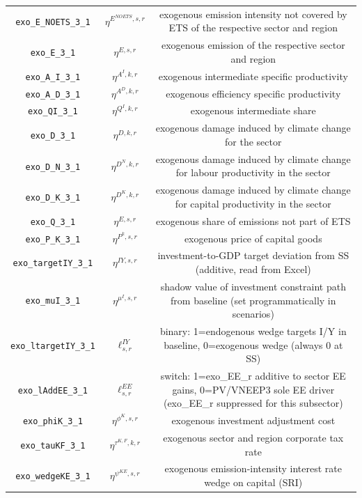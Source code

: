\begin{center}
\begin{longtable}{ccc}
\texttt{exo\_E\_NOETS\_3\_1} & ${\eta^{E^{NOETS},s,r}}$ & exogenous emission intensity not covered by ETS of the respective sector and region\\
\texttt{exo\_E\_3\_1} & ${\eta^{E,s,r}}$ & exogenous emission of the respective sector and region\\
\texttt{exo\_A\_I\_3\_1} & ${\eta^{A^{I},k,r}}$ & exogenous intermediate specific productivity\\
\texttt{exo\_A\_D\_3\_1} & ${\eta^{A^{D},k,r}}$ & exogenous efficiency specific productivity\\
\texttt{exo\_QI\_3\_1} & ${\eta^{Q^{I},k,r}}$ & exogenous intermediate share\\
\texttt{exo\_D\_3\_1} & ${\eta^{D,k,r}}$ & exogenous damage induced by climate change for the sector\\
\texttt{exo\_D\_N\_3\_1} & ${\eta^{D^{N},k,r}}$ & exogenous damage induced by climate change for labour productivity in the sector\\
\texttt{exo\_D\_K\_3\_1} & ${\eta^{D^{K},k,r}}$ & exogenous damage induced by climate change for capital productivity in the sector\\
\texttt{exo\_Q\_3\_1} & ${\eta^{E,s,r}}$ & exogenous share of emissions not part of ETS\\
\texttt{exo\_P\_K\_3\_1} & ${\eta^{P^k,s,r}}$ & exogenous price of capital goods\\
\texttt{exo\_targetIY\_3\_1} & ${\eta^{IY,s,r}}$ & investment-to-GDP target deviation from SS (additive, read from Excel)\\
\texttt{exo\_muI\_3\_1} & ${\eta^{\mu^{I},s,r}}$ & shadow value of investment constraint path from baseline (set programmatically in scenarios)\\
\texttt{exo\_ltargetIY\_3\_1} & ${\ell^{IY}_{s,r}}$ & binary: 1=endogenous wedge targets I/Y in baseline, 0=exogenous wedge (always 0 at SS)\\
\texttt{exo\_lAddEE\_3\_1} & ${\ell^{EE}_{s,r}}$ & switch: 1=exo\_EE\_r additive to sector EE gains, 0=PV/VNEEP3 sole EE driver (exo\_EE\_r suppressed for this subsector)\\
\texttt{exo\_phiK\_3\_1} & ${\eta^{\phi^{K},{s,r}}}$ & exogenous investment adjustment cost\\
\texttt{exo\_tauKF\_3\_1} & ${\eta^{\tau^{K,F},k,r}}$ & exogenous sector and region corporate tax rate\\
\texttt{exo\_wedgeKE\_3\_1} & ${\eta^{\psi^{KE},s,r}}$ & exogenous emission-intensity interest rate wedge on capital (SRI)\\

\end{longtable}
\end{center}

